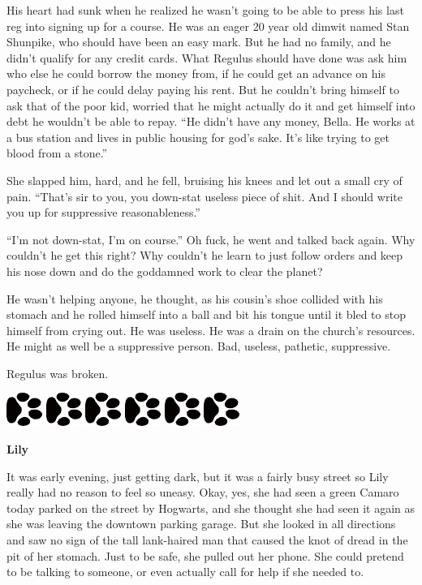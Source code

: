 \documentclass[12pt,twoside,openright]{memoir}
\newcommand{\dogPrintRule}{	
	\begin{center}
		\hspace{.5em}
		\includegraphics[angle=60]{dogprint.pdf}
		\hspace{.5em}
		\includegraphics[angle=120]{dogprint.pdf}
		\hspace{.5em}
		\includegraphics[angle=60]{dogprint.pdf}
		\hspace{.5em}
		\includegraphics[angle=120]{dogprint.pdf}
		\hspace{.5em}
		\includegraphics[angle=60]{dogprint.pdf}
		\hspace{.5em}
		\includegraphics[angle=120]{dogprint.pdf}
		\hspace{.5em}
	\end{center}
}
\begin{document}
His heart had sunk when he realized he wasn't going to be able to press his last reg into signing up for a course. He was an eager 20 year old dimwit named Stan Shunpike, who should have been an easy mark. But he had no family, and he didn't qualify for any credit cards. What Regulus should have done was ask him who else he could borrow the money from, if he could get an advance on his paycheck, or if he could delay paying his rent. But he couldn't bring himself to ask that of the poor kid, worried that he might actually do it and get himself into debt he wouldn't be able to repay. ``He didn't have any money, Bella. He works at a bus station and lives in public housing for god's sake. It's like trying to get blood from a stone.''

She slapped him, hard, and he fell, bruising his knees and let out a small cry of pain. ``That's sir to you, you down-stat useless piece of shit. And I should write you up for suppressive reasonableness.''

``I'm not down-stat, I'm on course.'' Oh fuck, he went and talked back again. Why couldn't he get this right? Why couldn't he learn to just follow orders and keep his nose down and do the goddamned work to clear the planet?

He wasn't helping anyone, he thought, as his cousin's shoe collided with his stomach and he rolled himself into a ball and bit his tongue until it bled to stop himself from crying out. He was useless. He was a drain on the church's resources. He might as well be a suppressive person. Bad, useless, pathetic, suppressive.

Regulus was broken.

\dogPrintRule

\textbf{Lily} 

It was early evening, just getting dark, but it was a fairly busy street so Lily really had no reason to feel so uneasy. Okay, yes, she had seen a green Camaro today parked on the street by Hogwarts, and she thought she had seen it again as she was leaving the downtown parking garage. But she looked in all directions and saw no sign of the tall lank-haired man that caused the knot of dread in the pit of her stomach. Just to be safe, she pulled out her phone. She could pretend to be talking to someone, or even actually call for help if she needed to.
\end{document}
